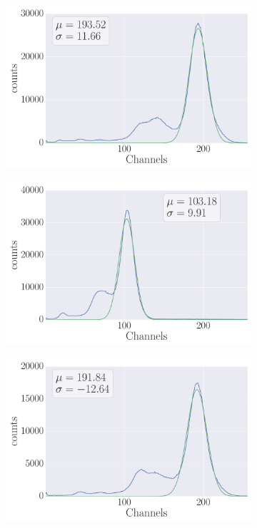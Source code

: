 \begin{figure}
    \begin{subfigure}[b]{\picwidth}
        \includegraphics[width=\textwidth]{analysis/figures/plot2_1a}
        \caption{}
    \end{subfigure}\qquad
    \begin{subfigure}[b]{\picwidth}
        \includegraphics[width=\textwidth]{analysis/figures/plot2_1b}
        \caption{}
    \end{subfigure}
    \begin{subfigure}[b]{\picwidth}
        \includegraphics[width=\textwidth]{analysis/figures/plot2_1c}

\end{subfigure}
\end{figure}
